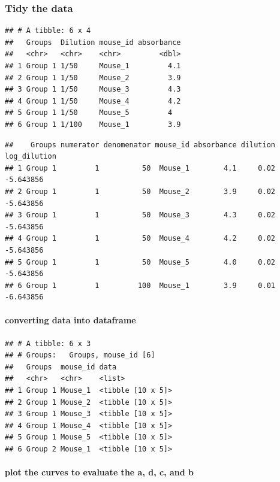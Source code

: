 \documentclass[
]{book}
\begin{document}
\hypertarget{tidy-the-data}{%
\subsubsection{Tidy the data}\label{tidy-the-data}}

\begin{verbatim}
## # A tibble: 6 x 4
##   Groups  Dilution mouse_id absorbance
##   <chr>   <chr>    <chr>         <dbl>
## 1 Group 1 1/50     Mouse_1         4.1
## 2 Group 1 1/50     Mouse_2         3.9
## 3 Group 1 1/50     Mouse_3         4.3
## 4 Group 1 1/50     Mouse_4         4.2
## 5 Group 1 1/50     Mouse_5         4  
## 6 Group 1 1/100    Mouse_1         3.9
\end{verbatim}

\begin{verbatim}
##    Groups numerator denomenator mouse_id absorbance dilution log_dilution
## 1 Group 1         1          50  Mouse_1        4.1     0.02    -5.643856
## 2 Group 1         1          50  Mouse_2        3.9     0.02    -5.643856
## 3 Group 1         1          50  Mouse_3        4.3     0.02    -5.643856
## 4 Group 1         1          50  Mouse_4        4.2     0.02    -5.643856
## 5 Group 1         1          50  Mouse_5        4.0     0.02    -5.643856
## 6 Group 1         1         100  Mouse_1        3.9     0.01    -6.643856
\end{verbatim}

\hypertarget{converting-data-into-dataframe}{%
\paragraph{converting data into dataframe}\label{converting-data-into-dataframe}}

\begin{verbatim}
## # A tibble: 6 x 3
## # Groups:   Groups, mouse_id [6]
##   Groups  mouse_id data             
##   <chr>   <chr>    <list>           
## 1 Group 1 Mouse_1  <tibble [10 x 5]>
## 2 Group 1 Mouse_2  <tibble [10 x 5]>
## 3 Group 1 Mouse_3  <tibble [10 x 5]>
## 4 Group 1 Mouse_4  <tibble [10 x 5]>
## 5 Group 1 Mouse_5  <tibble [10 x 5]>
## 6 Group 2 Mouse_1  <tibble [10 x 5]>
\end{verbatim}

\hypertarget{plot-the-curves-to-evaluate-the-a-d-c-and-b}{%
\paragraph{plot the curves to evaluate the a, d, c, and b}\label{plot-the-curves-to-evaluate-the-a-d-c-and-b}}
\end{document}
